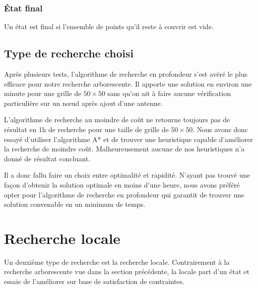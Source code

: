 \documentclass[12pt]{article}
\begin{document}
\subsubsection{État final}
Un état est final si l'ensemble de points qu'il reste à couvrir est vide.


\subsection{Type de recherche choisi}
Après plusieurs tests, l'algorithme de recherche en profondeur s'est avéré le plus efficace pour notre recherche arborescente. Il apporte une solution en environ une minute pour une grille de $50 \times 50$ sans qu'on ait à faire aucune vérification particulière sur un n\oe ud après ajout d'une antenne. 

L'algorithme de recherche au moindre de coût ne retourne toujours pas de résultat en 1h de recherche pour une taille de grille de $50 \times 50$.
Nous avons donc essayé d'utiliser l'algorithme A* et de trouver une heuristique capable d'améliorer la recherche de moindre coût. Malheureusement aucune de nos heuristiques n'a donné de résultat concluant.

Il a donc fallu faire un choix entre optimalité et rapidité. N'ayant pas trouvé une façon d'obtenir la solution optimale en moins d'une heure, nous avons préféré opter pour l'algorithme de recherche en profondeur qui garantit de trouver une solution convenable en un minimum de temps.



%
%


\section{Recherche locale}
Un deuxième type de recherche est la recherche locale. Contrairement à la recherche arborescente vue dans la section précédente, la locale part d'un état et essaie de l'améliorer sur base de satisfaction de contraintes.
\end{document}
